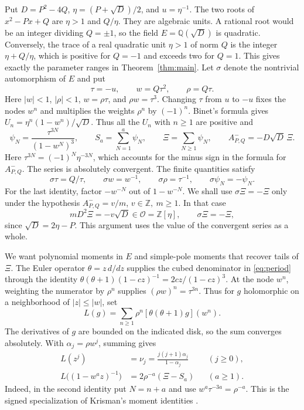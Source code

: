 \documentclass[11pt,letterpaper]{article}
\numberwithin{equation}{section}
\newcommand{\Q}{\mathbb Q}
\newcommand{\Z}{\mathbb Z}
\newcommand{\Ord}{\mathcal O}
\begin{document}
Put \(D=P^2-4Q\), \(\eta=(P+\sqrt D)/2\), and \(u=\eta^{-1}\).
The two roots of \(x^2-Px+Q\) are \(\eta>1\) and \(Q/\eta\).
They are algebraic units. A rational root would be an integer
dividing \(Q=\pm1\), so the field \(E=\Q(\sqrt D)\) is quadratic.
Conversely, the trace of a real quadratic unit \(\eta>1\) of norm
\(Q\) is the integer \(\eta+Q/\eta\), which is positive for \(Q=-1\)
and exceeds two for \(Q=1\). This gives exactly the parameter ranges
in Theorem~\ref{thm:main}. Let \(\sigma\) denote the nontrivial
automorphism of \(E\) and put
\[
     \tau=-u,\qquad w=Q\tau^2,\qquad \rho=Q\tau.
\]
Here \(|w|<1\), \(|\rho|<1\), \(w=\rho\tau\), and \(\rho w=\tau^3\).
Changing \(\tau\) from \(u\) to \(-u\) fixes the nodes \(w^n\) and
multiplies the weights \(\rho^n\) by \((-1)^n\). Binet's
formula gives \(U_n=\eta^n(1-w^n)/\sqrt D\). Thus all the \(U_n\)
with \(n\ge1\) are positive and
\begin{equation}\label{eq:period}
 \psi_N=\frac{\tau^{3N}}{(1-w^N)^3},\qquad
 S_a=\sum_{N=1}^{a}\psi_N,\qquad \Xi=\sum_{N\ge1}\psi_N,\qquad
 A^-_{P,Q}=-D\sqrt D\,\Xi.
\end{equation}
Here \(\tau^{3N}=(-1)^N\eta^{-3N}\), which accounts for the minus sign
in the formula for \(A^-_{P,Q}\). The series is absolutely convergent.
The finite quantities
satisfy
\begin{equation}\label{eq:conj}
 \sigma\tau=Q/\tau,\qquad \sigma w=w^{-1},\qquad
 \sigma\rho=\tau^{-1},\qquad \sigma\psi_N=-\psi_N .
\end{equation}
For the last identity, factor \(-w^{-N}\) out of \(1-w^{-N}\).
We shall use \(\sigma\Xi=-\Xi\) only under the hypothesis
\(A^-_{P,Q}=v/m\), \(v\in\Z,\ m\ge1\). In that case
\begin{equation}\label{eq:rational}
        mD^2\Xi=-v\sqrt D\in\Ord=\Z[\eta],
        \qquad \sigma\Xi=-\Xi ,
\end{equation}
since \(\sqrt D=2\eta-P\). This argument uses the value
of the convergent series as a whole.

We want polynomial moments in \(E\) and simple-pole moments that recover
tails of \(\Xi\). The Euler operator \(\theta=z\,d/dz\) supplies the
cubed denominator in \eqref{eq:period} through the identity
\(\theta(\theta+1)(1-cz)^{-1}=2cz/(1-cz)^3\).
At the node \(w^n\), weighting the numerator by \(\rho^n\) supplies
\((\rho w)^n=\tau^{3n}\). Thus for \(g\) holomorphic on a
neighborhood of \(|z|\le |w|\), set
\[
       L(g)=\sum_{n\ge1}\rho^n[\theta(\theta+1)g](w^n).
\]
The derivatives of \(g\) are bounded on the indicated disk, so the sum
converges absolutely. With \(\alpha_j=\rho w^j\), summing gives
\begin{align}
 L(z^j)&=\nu_j=\frac{j(j+1)\alpha_j}{1-\alpha_j}
               &&(j\ge0),\label{eq:monomials}\\
 L\big((1-w^az)^{-1}\big)&=2\rho^{-a}(\Xi-S_a)
               &&(a\ge1).\label{eq:poles}
\end{align}
Indeed, in the second identity put \(N=n+a\) and use
\(w^a\tau^{-3a}=\rho^{-a}\). This is the signed specialization of
Krisman's moment identities \cite[Section~2]{KLucas}.
\end{document}
